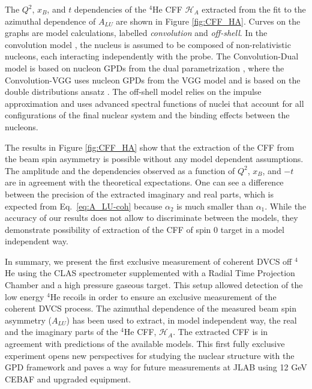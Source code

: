 \documentclass[twocolumn,nofootinbib,showpacs,prl,superscriptaddress,secnumarabic,amssymb,nobibnotes,aps,floatfix]{revtex4}
\begin{document}
The $Q^2$, $x_B$, and $t$ dependencies of the $^4$He CFF $\mathcal{H}_A$ 
extracted from the fit to the azimuthal dependence of $A_{LU}$ are shown in 
Figure \ref{fig:CFF_HA}. Curves on the graphs are model calculations, labelled 
{\it convolution} and {\it off-shell}. In the convolution model 
\cite{Vadim_priv}, the nucleus is assumed to be composed of non-relativistic 
nucleons, each interacting independently with the probe. The Convolution-Dual 
model is based on nucleon GPDs from the dual parametrization 
\cite{Guzey:2006xi}, where the Convolution-VGG uses nucleon GPDs  from the VGG 
model and is based on the double distributions ansatz \cite{DD_model}. The 
off-shell model \cite{GonzalezHernandez:2012jv} relies on the impulse 
approximation and uses advanced spectral functions of  nuclei that account for 
all configurations of the final nuclear system and the binding effects between 
the nucleons.

The results in Figure \ref{fig:CFF_HA} show that the extraction of the CFF
from the beam spin asymmetry is possible without any model dependent 
assumptions. The amplitude and the dependencies observed as a function of 
$Q^{2}$, $x_B$, and $-t$ are in agreement 
with the theoretical expectations. One can see a difference between the 
precision of the extracted imaginary and real parts, which is expected from
Eq.~\ref{eq:A_LU-coh} because $\alpha_2$ is much smaller than $\alpha_1$. While the 
accuracy of our results does not allow to discriminate between the models, they 
demonstrate possibility of extraction of the CFF of spin 0 target in a model 
independent way.


In summary, we present the first exclusive measurement of coherent DVCS off 
$^4$He using the CLAS spectrometer supplemented with a Radial Time Projection 
Chamber and a high pressure gaseous target. This setup allowed detection of the 
low energy $^4$He recoils in order to ensure an exclusive measurement of the
coherent DVCS process.
The azimuthal dependence of the measured beam spin asymmetry ($A_{LU}$) has 
been used to extract, in model independent way, the real and the imaginary 
parts of the $^4$He CFF, $\mathcal{H}_A$. The extracted CFF is in  
agreement with predictions of the available models. This first fully exclusive 
experiment opens new perspectives for studying the nuclear structure with the 
GPD framework and paves a way for future measurements at JLAB using 12 GeV 
CEBAF and upgraded equipment.

\end{document}
